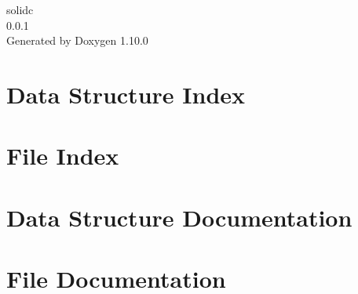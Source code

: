 \documentclass[twoside]{book}
\newcommand{\+}{\discretionary{\mbox{\scriptsize$\hookleftarrow$}}{}{}}
\newcommand{\clearemptydoublepage}{%
    \newpage{\pagestyle{empty}\cleardoublepage}%
  }
\begin{document}
  \raggedbottom
    \hypersetup{pageanchor=false,
                bookmarksnumbered=true,
                pdfencoding=unicode
               }
  \begin{titlepage}
  \vspace*{7cm}
  \begin{center}%
  {\Large solidc}\\
  [1ex]\large 0.\+0.\+1 \\
  \vspace*{1cm}
  {\large Generated by Doxygen 1.10.0}\\
  \end{center}
  \end{titlepage}
  \clearemptydoublepage
  \tableofcontents
  \clearemptydoublepage
  \hypersetup{pageanchor=true}

\chapter{Data Structure Index}

\chapter{File Index}

\chapter{Data Structure Documentation}


















\chapter{File Documentation}













  \backmatter
  \newpage
  \clearemptydoublepage
  \printindex
\end{document}
